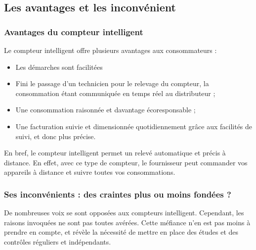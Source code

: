 \subsection{Les avantages et les inconvénient}

\subsubsection{Avantages du compteur intelligent}
Le compteur intelligent offre plusieurs avantages aux consommateurs :
\begin{itemize}[label=\textbullet]
\item Les démarches sont facilitées 
\item Fini le passage d'un technicien pour le relevage du compteur, la consommation étant communiquée en temps réel au distributeur ;
\item Une consommation raisonnée et davantage écoresponsable ;
\item Une facturation suivie et dimensionnée quotidiennement grâce aux facilités de suivi, et donc plus précise.
\end{itemize}

En bref, le compteur intelligent permet un relevé automatique et précis à distance. En effet, avec ce type de compteur, le fournisseur peut commander vos appareils à distance et suivre toutes vos consommations.

\subsubsection{Ses inconvénients : des craintes plus ou moins fondées ?}
De nombreuses voix se sont opposées aux compteurs intelligent. Cependant, les raisons invoquées ne sont pas toutes avérées. Cette méfiance n'en est pas moins à prendre en compte, et révèle la nécessité de mettre en place des études et des contrôles réguliers et indépendants.

